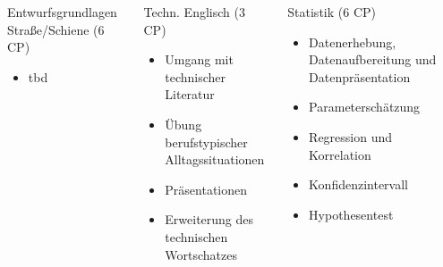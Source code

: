 \documentclass[slidestop,compress,mathserif, aspectratio = 169, 9pt]{beamer}
\begin{document}
{ \begin{columns}[t] 
     \begin{column}[T]{4.5cm} 
     Entwurfsgrundlagen Stra{\ss}e/Schiene (6 CP)
     	\begin{itemize}
     	\item tbd
     	\end{itemize}
     \end{column}
     	\begin{column}[T]{4.5cm} 
	Techn. Englisch (3 CP)
     	\begin{itemize}
     	\item  Umgang mit technischer Literatur
	\item Übung berufstypischer Alltagssituationen
	\item Präsentationen
	\item Erweiterung des technischen Wortschatzes
     	\end{itemize}
     \end{column}
     \begin{column}[T]{4.5cm} 
     Statistik (6 CP)
     	\begin{itemize}
     	\item Datenerhebung, Datenaufbereitung und Datenpräsentation
     	\item Parameterschätzung
     	\item Regression und Korrelation
     	\item Konfidenzintervall
     	\item Hypothesentest
     	\end{itemize}
     \end{column}
 \end{columns}

}

\end{document}
